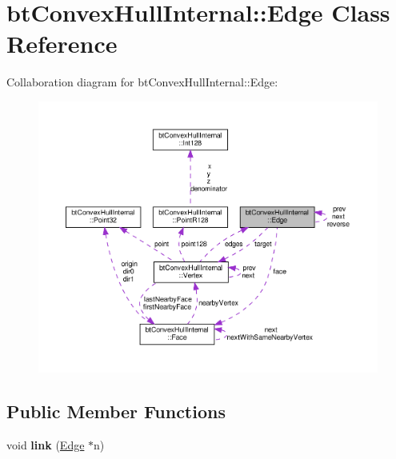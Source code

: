 \hypertarget{classbtConvexHullInternal_1_1Edge}{}\section{bt\+Convex\+Hull\+Internal\+:\+:Edge Class Reference}
\label{classbtConvexHullInternal_1_1Edge}


Collaboration diagram for bt\+Convex\+Hull\+Internal\+:\+:Edge\+:
\nopagebreak
\begin{figure}[H]
\begin{center}
\leavevmode
\includegraphics[width=350pt]{classbtConvexHullInternal_1_1Edge__coll__graph}
\end{center}
\end{figure}
\subsection*{Public Member Functions}
\begin{DoxyCompactItemize}
\item 
\mbox{\label{classbtConvexHullInternal_1_1Edge_a3d231af3c0b32a13a0ae59e1b44d18c1}} 
void {\bfseries link} (\hyperlink{classbtConvexHullInternal_1_1Edge}{Edge} $\ast$n)
\end{DoxyCompactItemize}
